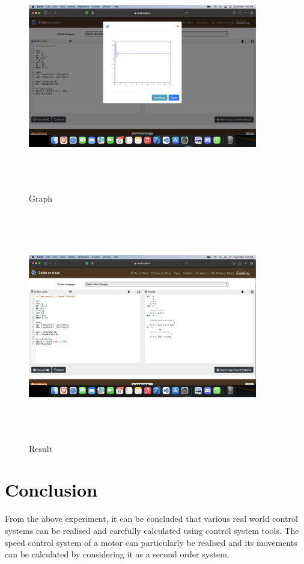 \documentclass[12pt]{article}
\begin{document}
\begin{figure}[!hth]
        \centering
        \includegraphics[width =10cm, height = 10cm]{images/Experiment1-output..png}
        \caption{Graph}
        \label{Graph}
\end{figure}
\begin{figure}[!hth]
        \centering
        \includegraphics[width =10cm, height = 10cm]{images/Experiment1.png}
        \caption{Result}
        \label{Result}
\end{figure}

\section*{\textcolor{black}{Conclusion}}
From the above experiment, it can be concluded that various real world control systems can be realised and carefully calculated using control system tools. The speed control system of a motor can particularly be realised and its movements can be calculated by considering it as a second order system.
      
\end{document}
